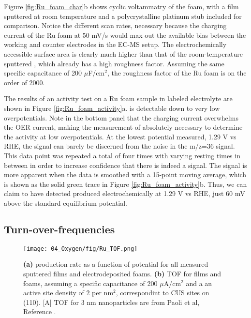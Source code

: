 Figure \ref{fig:Ru_foam_char}b shows cyclic voltammatry of the  foam, with a  film sputtered at room temperature and a polycrystalline platinum stub included for comparison. Notice the different scan rates, necessary because the charging current of the Ru foam at 50 mV/s would max out the available bias between the working and counter electrodes in the EC-MS setup. The electrochemically accessible surface area is clearly much higher than that of the room-temperature sputtered , which already has a high roughness factor. Assuming the same specific capacitance of 200 $\mu$F/cm$^{2}$\cite{Yoshida2013}, the roughness factor of the Ru foam is on the order of 2000.

The results of an activity test on a Ru foam sample in labeled electrolyte are shown in Figure \ref{fig:Ru_foam_activity}a.  is detectable down to very low overpotentials. Note in the bottom panel that the charging current overwhelms the OER current, making the measurement of  absolutely necessary to determine the activity at low overpotentials. At the lowest potential measured, 1.29 V vs RHE, the signal can barely be discerned from the noise in the m/z=36 signal. This data point was repeated a total of four times with varying resting times in between in order to increase confidence that there is indeed a signal. The signal is more apparent when the data is smoothed with a 15-point moving average, which is shown as the solid green trace in Figure \ref{fig:Ru_foam_activity}b. Thus, we can claim to have detected  produced electrochemically at 1.29 V vs RHE, just 60 mV above the standard equilibrium potential.


\subsection{Turn-over-frequencies}\label{subsec:TOF}

\begin{figure}[h!]
	\centering
	\texttt{[image: 04\_Oxygen/fig/Ru\_TOF.png]}
	\caption{\textbf{(a)}  production rate as a function of potential for all measured sputtered  films and electrodeposited  foams. \textbf{(b)} TOF for films and foams, assuming a specific capacitance of 200 $\mu$A/cm$^2$ and a an active site density of 2 per nm$^2$, correspondint to CUS sites on (110)\cite{Rao2017a}. [A] TOF for 3 nm  nanoparticles are from Paoli et al, Reference .}
	\label{fig:Ru_TOF}
\end{figure}

